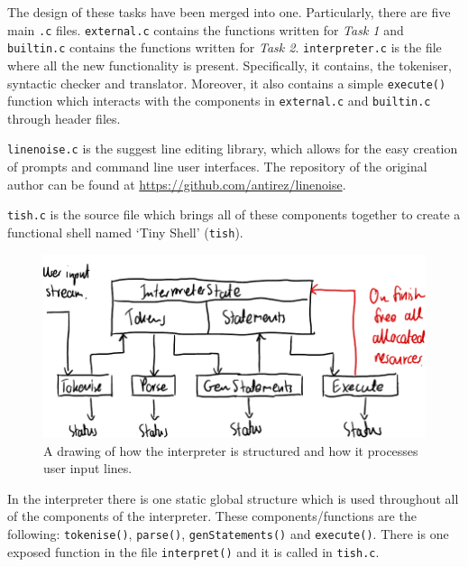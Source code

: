 \documentclass[12pt]{article}
\begin{document}
The design of these tasks have been merged into one.
Particularly, there are five main \texttt{.c} files.
\texttt{external.c} contains the functions written for
\textit{Task 1} and \texttt{builtin.c} contains the functions
written for \textit{Task 2}. \texttt{interpreter.c} is the file
where all the new functionality is present. Specifically, it
contains, the tokeniser, syntactic checker and translator.
Moreover, it also contains a simple \texttt{execute()} function
which interacts with the components in \texttt{external.c} and
\texttt{builtin.c} through header files.

\texttt{linenoise.c} is the suggest line editing library, which
allows for the easy creation of prompts and command line user
interfaces. The repository of the original author can be found
at \url{https://github.com/antirez/linenoise}.

\texttt{tish.c} is the source file which brings all of these
components together to create a functional shell named `Tiny
Shell' (\texttt{tish}).

\begin{figure}[H]
\centering
\includegraphics{interpreter-arch}
\caption{A drawing of how the interpreter is structured and how
it processes user input lines.}
\end{figure}



In the interpreter there is one static global structure which is
used throughout all of the components of the interpreter. These
components/functions are the following: \texttt{tokenise()},
\texttt{parse()}, \texttt{genStatements()} and
\texttt{execute()}. There is one exposed function in the file
\texttt{interpret()} and it is called in \texttt{tish.c}.
\end{document}
